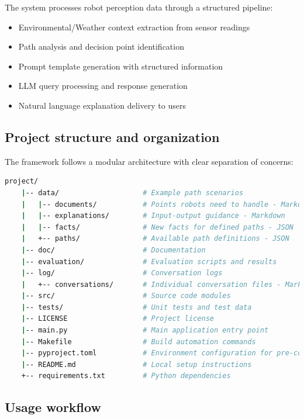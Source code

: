The system processes robot perception data through a structured pipeline:
\begin{itemize}
    \item Environmental/Weather context extraction from sensor readings
    \item Path analysis and decision point identification
    \item Prompt template generation with structured information
    \item LLM query processing and response generation
    \item Natural language explanation delivery to users
\end{itemize}


\subsection{Project structure and organization}

The framework follows a modular architecture with clear separation of concerns:

\begin{lstlisting}[language=bash]
    project/
    |-- data/                    # Example path scenarios
    |   |-- documents/           # Points robots need to handle - Markdown
    |   |-- explanations/        # Input-output guidance - Markdown
    |   |-- facts/               # New facts for defined paths - JSON
    |   +-- paths/               # Available path definitions - JSON
    |-- doc/                     # Documentation
    |-- evaluation/              # Evaluation scripts and results
    |-- log/                     # Conversation logs
    |   +-- conversations/       # Individual conversation files - Markdown
    |-- src/                     # Source code modules
    |-- tests/                   # Unit tests and test data
    |-- LICENSE                  # Project license
    |-- main.py                  # Main application entry point
    |-- Makefile                 # Build automation commands
    |-- pyproject.toml           # Environment configuration for pre-commit
    |-- README.md                # Local setup instructions
    +-- requirements.txt         # Python dependencies
\end{lstlisting}

\subsection{Usage workflow}

